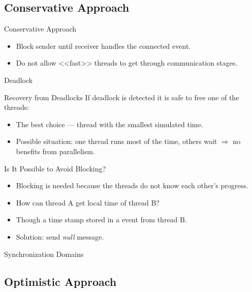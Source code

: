 \subsection{Conservative Approach}

\begin{frame}{Conservative Approach}
  \begin{itemize}
    \item Block sender until receiver handles the connected event.
    \item Do not allow <<fast>> threads to get through communication stages.
  \end{itemize}
  \centering
\end{frame}

\begin{frame}{Deadlock}
  \centering
\end{frame}

\begin{frame}{Recovery from Deadlocks}
  If deadlock is detected it is safe to free one of the threads:
  \begin{itemize}
    \item The best choice --- thread with the smallest simulated time.
    \item Possible situation: one thread runs most of the time, others wait
      $\Rightarrow$ no benefits from parallelism.
  \end{itemize}
\end{frame}

\begin{frame}{Is It Possible to Avoid Blocking?}
  \begin{itemize}
    \item Blocking is needed because the threads do not know each other's
      progress.
    \item How can thread A get local time of thread B? \pause
    \item Though a time stamp stored in a event from thread B.
    \item Solution: send \textit{null} message.
  \end{itemize}
\end{frame}

\begin{frame}{Synchronization Domains}
  \centering
\end{frame}

\subsection{Optimistic Approach}

